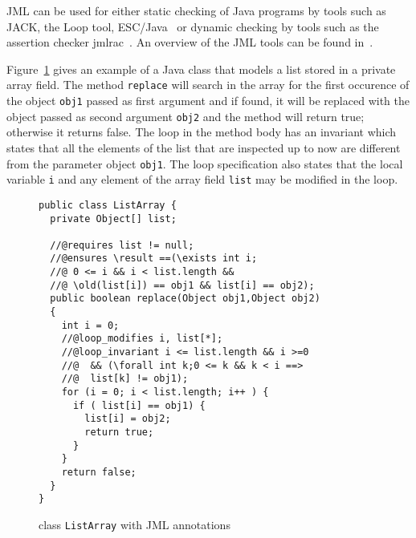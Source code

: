 JML can be used for either static checking of Java programs by tools such as JACK, the Loop tool, 
ESC/Java~\cite{escjava} or dynamic checking by tools such as the assertion checker jmlrac~\cite{jmlrac}. An overview of the JML tools can 
be found in~\cite{BurdyCCEKLLP03}.
     
Figure~\ref{replaceSrc} gives an example of a Java class that models a list stored in a private array field. 
The method \texttt{replace} will search in the array for the first occurence of the object \texttt{obj1} passed as first argument and if found, it will be replaced with the object passed as second argument \texttt{obj2} and the method will return true; otherwise it returns false. The loop in the method body has an invariant which states that all the elements of the list that are inspected up to now are different from the parameter object \texttt{obj1}. The loop specification also states
that the local variable \texttt{i} and any element of the array field \texttt{list} may be modified in the loop.

\begin{figure}[ht!]
\begin{verbatim}
public class ListArray {
  private Object[] list;

  //@requires list != null;
  //@ensures \result ==(\exists int i; 
  //@ 0 <= i && i < list.length && 
  //@ \old(list[i]) == obj1 && list[i] == obj2); 
  public boolean replace(Object obj1,Object obj2)
  {
    int i = 0;
    //@loop_modifies i, list[*];
    //@loop_invariant i <= list.length && i >=0 
    //@  && (\forall int k;0 <= k && k < i ==> 
    //@  list[k] != obj1); 
    for (i = 0; i < list.length; i++ ) {
      if ( list[i] == obj1) {
        list[i] = obj2;
        return true;	
      }
    }
    return false;
  }
}
\end{verbatim}
\caption{class \texttt{ListArray} with JML annotations} 
\label{replaceSrc}
\end{figure}


